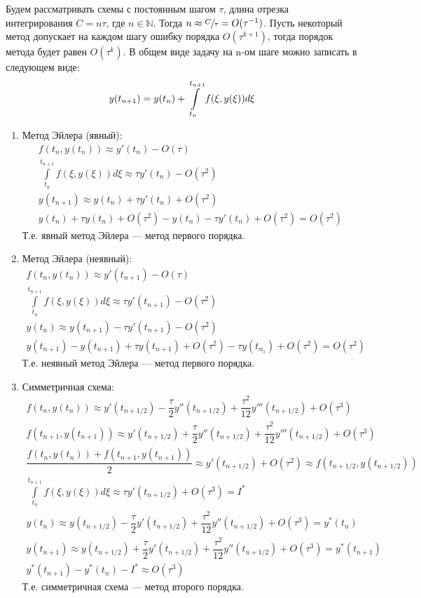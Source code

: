 \documentclass[12pt, a4paper]{article}
\begin{document}
\begin{enumerate}
		Будем рассматривать схемы с постоянным шагом $\tau$, длина отрезка интегрирования $C = n\tau$, где $n \in \mathbb{N}$. Тогда $n \approx \sfrac{C}{\tau}=O(\tau^{-1})$. Пусть некоторый метод допускает на каждом шагу ошибку порядка $O(\tau^{k+1})$, тогда порядок метода будет равен $O(\tau^k)$.
		В общем виде задачу на n-ом шаге можно записать в следующем виде:
		\[
		y(t_{n+1}) = y(t_n) + \int\limits_{t_n}^{t_{n+1}}f(\xi, y(\xi)) d\xi \\
		\] 
		\begin{enumerate}
			\item Метод Эйлера (явный):
			\begin{gather*}
				f(t_n, y(t_n)) \approx y'(t_n) - O(\tau) \\
				\int\limits_{t_n}^{t_{n+1}} f(\xi, y(\xi)) d\xi \approx \tau y'(t_n) - O(\tau^2) \\
				y(t_{n+1}) \approx y(t_{n}) + \tau y'(t_{n}) + O(\tau^2) \\
				y(t_{n}) + \tau y(t_{n}) + O(\tau^2) - y(t_{n}) - \tau y'(t_{n}) + O(\tau^2) = O(\tau^2)
			\end{gather*}
			Т.е. явный метод Эйлера --- метод первого порядка.
			\item Метод Эйлера (неявный):
			\begin{gather*}
					f(t_n, y(t_n)) \approx y'(t_{n+1}) - O(\tau) \\
				\int\limits_{t_n}^{t_{n+1}} f(\xi, y(\xi)) d\xi \approx \tau y'(t_{n+1}) - O(\tau^2) \\
				y(t_{n}) \approx y(t_{n+1}) - \tau y'(t_{n+1}) - O(\tau^2) \\
				y(t_{n+1})  - y(t_{n+1}) + \tau y(t_{n+1}) + O(\tau^2) - \tau y(t_{n_1}) + O(\tau^2) = O(\tau^2)
			\end{gather*}
			Т.е. неявный метод Эйлера --- метод первого порядка.
			\item Симметричная схема:
			\begin{gather*}
				f(t_n, y(t_n)) \approx y'(t_{n+1/2}) - \dfrac{\tau}{2} y''(t_{n+1/2}) + \dfrac{\tau^2}{12} y'''(t_{n+1/2}) + O(\tau^3) \\
				f(t_{n+1}, y(t_{n+1})) \approx y'(t_{n+1/2}) + \dfrac{\tau}{2} y''(t_{n+1/2}) + \dfrac{\tau^2}{12} y'''(t_{n+1/2}) + O(\tau^3) \\
				\dfrac{f(t_n, y(t_n)) + f(t_{n+1}, y(t_{n+1}))}{2} \approx y'(t_{n+1/2}) + O(\tau^2) \approx f(t_{n+1/2}, y(t_{n+1/2})) \\
				\int\limits_{t_n}^{t_{n+1}} f(\xi, y(\xi)) d\xi \approx \tau  y'(t_{n+1/2}) + O(\tau^3) = I^*\\
				y(t_n) \approx y(t_{n+1/2}) - \dfrac{\tau}{2} y'(t_{n+1/2}) + \dfrac{\tau^2}{12} y''(t_{n+1/2}) + O(\tau^3) = y^*(t_{n}) \\
				y(t_{n+1}) \approx y(t_{n+1/2}) + \dfrac{\tau}{2} y'(t_{n+1/2}) + \dfrac{\tau^2}{12} y''(t_{n+1/2}) + O(\tau^3) = y^*(t_{n+1})  \\
				y^*(t_{n+1}) - y^*(t_n) - I^* \approx O(\tau^3) 
			\end{gather*}
			Т.е. симметричная схема --- метод второго порядка.
		\end{enumerate}
		

\end{enumerate}
\end{document}

